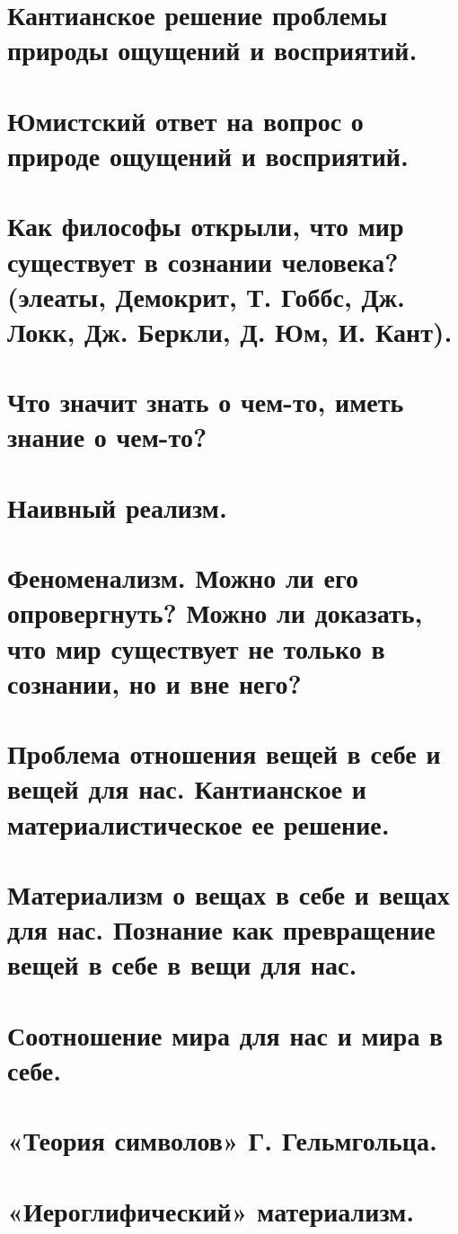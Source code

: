 \section{ Кантианское решение проблемы природы ощущений и восприятий.}
\section{ Юмистский ответ на вопрос о природе ощущений и восприятий.}
\section{ Как философы открыли, что мир существует в сознании человека? (элеаты, Демокрит, Т. Гоббс, Дж. Локк, Дж. Беркли, Д. Юм, И. Кант).}
\section{ Что значит знать о чем-то, иметь знание о чем-то?}
\section{ Наивный реализм.}
\section{ Феноменализм. Можно ли его опровергнуть? Можно ли доказать, что мир существует не только в сознании, но и вне него?}
\section{ Проблема отношения вещей в себе и вещей для нас. Кантианское и материалистическое ее решение.}
\section{ Материализм о вещах в себе и вещах для нас. Познание как превращение вещей в себе в вещи для нас.}
\section{ Соотношение мира для нас и мира в себе.}
\section{ «Теория символов» Г. Гельмгольца.}
\section{ «Иероглифический» материализм.}
